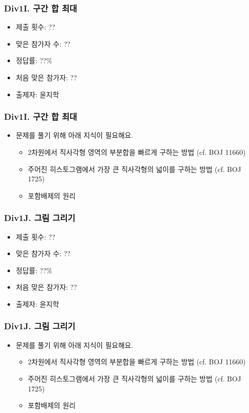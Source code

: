 \documentclass[xetex]{beamer}
\begin{document}
\begin{frame}
  \frametitle{Div1I. 구간 합 최대}
  \begin{itemize}
    \item 제출 횟수: ??
    \item 맞은 참가자 수: ??
    \item 정답률: ??\%
    \item 처음 맞은 참가자: ??
    \item 출제자: 윤지학
  \end{itemize}
\end{frame}

\begin{frame}
  \frametitle{Div1I. 구간 합 최대}
  \begin{itemize}
    \item 문제를 풀기 위해 아래 지식이 필요해요.
    \begin{itemize}
      \item 2차원에서 직사각형 영역의 부분합을 빠르게 구하는 방법 (cf. BOJ 11660)
      \item 주어진 히스토그램에서 가장 큰 직사각형의 넓이를 구하는 방법 (cf. BOJ 1725)
      \item 포함배제의 원리
    \end{itemize}
  \end{itemize}
\end{frame}

\begin{frame}
  \frametitle{Div1J. 그림 그리기}
  \begin{itemize}
    \item 제출 횟수: ??
    \item 맞은 참가자 수: ??
    \item 정답률: ??\%
    \item 처음 맞은 참가자: ??
    \item 출제자: 윤지학
  \end{itemize}
\end{frame}

\begin{frame}
  \frametitle{Div1J. 그림 그리기}
  \begin{itemize}
    \item 문제를 풀기 위해 아래 지식이 필요해요.
    \begin{itemize}
      \item 2차원에서 직사각형 영역의 부분합을 빠르게 구하는 방법 (cf. BOJ 11660)
      \item 주어진 히스토그램에서 가장 큰 직사각형의 넓이를 구하는 방법 (cf. BOJ 1725)
      \item 포함배제의 원리
    \end{itemize}
  \end{itemize}
\end{frame}
\end{document}
